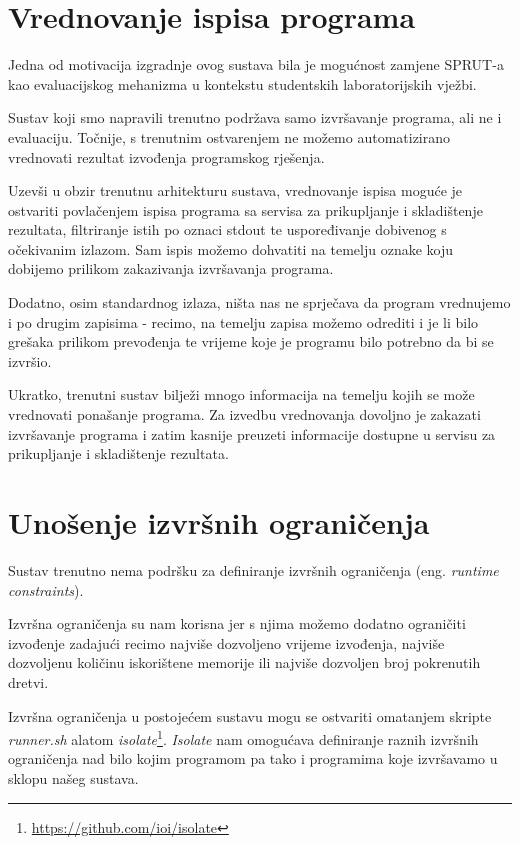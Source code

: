 \documentclass[times, utf8, zavrsni]{fer}
\begin{document}
{\section{Vrednovanje ispisa programa}

Jedna od motivacija izgradnje ovog sustava bila je mogućnost zamjene SPRUT-a kao evaluacijskog mehanizma u kontekstu studentskih laboratorijskih vježbi.

Sustav koji smo napravili trenutno podržava samo izvršavanje programa, ali ne i evaluaciju. Točnije, s trenutnim ostvarenjem ne možemo automatizirano vrednovati rezultat izvođenja programskog rješenja.

Uzevši u obzir trenutnu arhitekturu sustava, vrednovanje ispisa moguće je ostvariti povlačenjem ispisa programa sa servisa za prikupljanje i skladištenje rezultata, filtriranje istih po oznaci stdout te uspoređivanje dobivenog s očekivanim izlazom. Sam ispis možemo dohvatiti na temelju oznake koju dobijemo prilikom zakazivanja izvršavanja programa.

Dodatno, osim standardnog izlaza, ništa nas ne sprječava da program vrednujemo i po drugim zapisima - recimo, na temelju zapisa možemo odrediti i je li bilo grešaka prilikom prevođenja te vrijeme koje je programu bilo potrebno da bi se izvršio.

Ukratko, trenutni sustav bilježi mnogo informacija na temelju kojih se može vrednovati ponašanje programa. Za izvedbu vrednovanja dovoljno je zakazati izvršavanje programa i zatim kasnije preuzeti informacije dostupne u servisu za prikupljanje i skladištenje rezultata.

\section{Unošenje izvršnih ograničenja}

Sustav trenutno nema podršku za definiranje izvršnih ograničenja (eng. {\textit{runtime constraints}}).

Izvršna ograničenja su nam korisna jer s njima možemo dodatno ograničiti izvođenje zadajući recimo najviše dozvoljeno vrijeme izvođenja, najviše dozvoljenu količinu iskorištene memorije ili najviše dozvoljen broj pokrenutih dretvi.

Izvršna ograničenja u postojećem sustavu mogu se ostvariti omatanjem skripte {\textit{runner.sh}} alatom {\textit{isolate}}\footnote{\url{https://github.com/ioi/isolate}}. {\textit{Isolate}} nam omogućava definiranje raznih izvršnih ograničenja nad bilo kojim programom pa tako i programima koje izvršavamo u sklopu našeg sustava.

}
\end{document}
